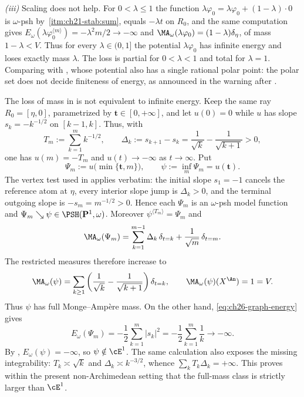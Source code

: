 \begin{example}
\emph{(iii)}  Scaling does not help.  For $0<\lambda\leq1$ the function
$\lambda\varphi_0=\lambda\varphi_0+(1-\lambda)\cdot0$ is
$\omega$-psh by
\,\cref{itm:ch21-stab:sum}, equals $-\lambda t$ on
$R_0$, and the same computation gives
$E_\omega(\lambda\varphi_0^{\langle m\rangle})=-\lambda^2m/2\to-\infty$ and
$\MA_\omega(\lambda\varphi_0)=(1-\lambda)\delta_\eta$, of mass
$1-\lambda<V$.  Thus for every $\lambda\in(0,1]$ the potential
$\lambda\varphi_0$ has infinite energy and loses exactly mass $\lambda$. The loss is partial for $0<\lambda<1$ and total for $\lambda=1$.  Comparing with
, whose potential also has a single
rational polar point: the polar set does not decide finiteness of energy, as
announced in the warning after .
\end{example}

\begin{example}
\label{ex:ch26-full-mass-infinite-energy}
The loss of mass in  is not equivalent to
infinite energy.  Keep the same ray $R_0=[\eta,0]$, parametrized by
$\mathbf t\in[0,+\infty]$, and let $u(0)=0$ while $u$ has slope
$s_k=-k^{-1/2}$ on $[k-1,k]$.  Thus, with
\[
 T_m:=\sum_{k=1}^m k^{-1/2},
 \qquad
 \Delta_k:=s_{k+1}-s_k
   =\frac1{\sqrt{k}}-\frac1{\sqrt{k+1}}>0,
\]
one has $u(m)=-T_m$ and $u(t)\to-\infty$ as $t\to\infty$.  Put
\[
 \Psi_m:=u\bigl(\min\{\mathbf t,m\}\bigr),
 \qquad
 \psi:=\inf_m\Psi_m=u(\mathbf t).
\]
The vertex test used in
 applies verbatim: the initial slope
$s_1=-1$ cancels the reference atom at $\eta$, every interior slope jump is
$\Delta_k>0$, and the terminal outgoing slope is $-s_m=m^{-1/2}>0$.
Hence each $\Psi_m$ is an $\omega$-psh model function and
$\Psi_m\searrow\psi\in\PSH(\mathbf P^1,\omega)$.  Moreover
$\psi^{\langle T_m\rangle}=\Psi_m$ and
\[
 \MA_\omega(\Psi_m)
 =\sum_{k=1}^{m-1}\Delta_k\,\delta_{t=k}
   +\frac1{\sqrt m}\,\delta_{t=m}.
\]
The restricted measures therefore increase to
\begin{equation}
\label{eq:ch26-full-mass-infinite-measure}
 \MA_\omega(\psi)
 =\sum_{k\geq1}\left(\frac1{\sqrt{k}}-
                    \frac1{\sqrt{k+1}}\right)\delta_{t=k},
 \qquad
 \MA_\omega(\psi)(X^{\An})=1=V.
\end{equation}
Thus $\psi$ has full Monge--Amp\`ere mass.  On the other hand,
\eqref{eq:ch26-graph-energy} gives
\[
 E_\omega(\Psi_m)
 =-\frac12\sum_{k=1}^m|s_k|^2
 =-\frac12\sum_{k=1}^m\frac1k\longrightarrow-\infty.
\]
By , $E_\omega(\psi)=-\infty$, so
$\psi\notin\cE^1$.  The same calculation also exposes the missing
integrability: $T_k\asymp\sqrt{k}$ and
$\Delta_k\asymp k^{-3/2}$, whence
$\sum_kT_k\Delta_k=+\infty$.  This proves within the present
non-Archimedean setting that the full-mass class is strictly larger than
$\cE^1$.
\end{example}

